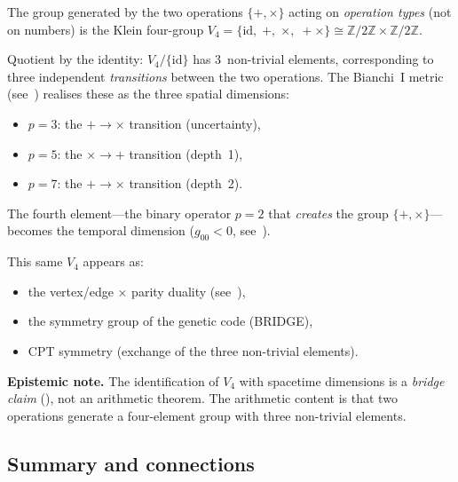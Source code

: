 \documentclass[12pt,a4paper]{article}
\begin{document}
\begin{remark}
\label{rem:V4_dimensions}
The group generated by the two operations $\{+, \times\}$
acting on \emph{operation types} (not on numbers) is
the Klein four-group
$V_4 = \{\mathrm{id},\; +,\; \times,\; {+}{\times}\}
\cong \mathbb{Z}/2\mathbb{Z} \times \mathbb{Z}/2\mathbb{Z}$.

Quotient by the identity: $V_4 / \{\mathrm{id}\}$ has
$3$~non-trivial elements, corresponding to three independent
\emph{transitions} between the two operations.
The Bianchi~I metric (see~\cite{companion_physics}) realises these
as the three spatial dimensions:
\begin{itemize}[nosep]
\item $p = 3$: the $+ \to \times$ transition (uncertainty),
\item $p = 5$: the $\times \to +$ transition (depth~1),
\item $p = 7$: the $+ \to \times$ transition (depth~2).
\end{itemize}
The fourth element---the binary operator $p = 2$ that
\emph{creates} the group $\{+, \times\}$---becomes the temporal
dimension ($g_{00} < 0$, see~\cite{companion_physics}).

This same $V_4$ appears as:
\begin{itemize}[nosep]
\item the vertex/edge $\times$ parity duality
  (see~\cite{companion_physics}),
\item the symmetry group of the genetic code (BRIDGE),
\item CPT symmetry (exchange of the three non-trivial elements).
\end{itemize}

\textbf{Epistemic note.}
The identification of $V_4$ with spacetime dimensions is a
\emph{bridge claim} (\cite{companion_M5}), not an arithmetic
theorem.  The arithmetic content is that two operations generate
a four-element group with three non-trivial elements.
\end{remark}

\subsection{Summary and connections}
\label{sec:ch5_summary}
\end{document}
